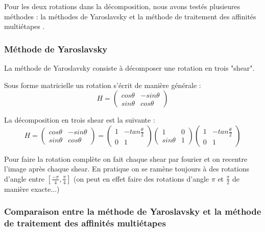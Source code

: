 
Pour les deux rotations dans la décomposition, nous avons testés plusieures méthodes : la méthodes de Yaroslavsky \cite{unser1995convolution} et la méthode de traitement des affinités multiétapes \cite{szeliski2010high}.

\subsubsection{Méthode de Yaroslavsky}

La méthode de Yaroslavsky consiste à décomposer une rotation en trois "shear".

Sous forme matricielle un rotation s'écrit de manière générale :
\begin{equation*}
	H=\begin{pmatrix}
	cos \theta&-sin \theta\\sin \theta&cos \theta
	\end{pmatrix}
	\end{equation*}

La décomposition en trois shear est la suivante :
\begin{equation*}
	H=\begin{pmatrix}
	cos \theta&-sin \theta\\sin \theta&cos \theta
	\end{pmatrix}=\begin{pmatrix}
	1&-tan \frac{\theta}{2}\\0&1
	\end{pmatrix}\begin{pmatrix}
	1&0\\sin \theta&1
	\end{pmatrix}\begin{pmatrix}
	1&-tan \frac{\theta}{2}\\0&1
	\end{pmatrix}
	\end{equation*}

	Pour faire la rotation complète on fait chaque shear par fourier et on recentre l'image après chaque shear.
	En pratique on se ramène toujours à des rotations d'angle entre $[\frac{-\pi}{4},\frac{\pi}{4}]$ (on peut en effet faire des rotations d'angle $\pi$ et $\frac{\pi}{2}$ de manière exacte...)  


\subsubsection{Comparaison entre la méthode de Yaroslavsky et la méthode de traitement des affinités multiétapes}

